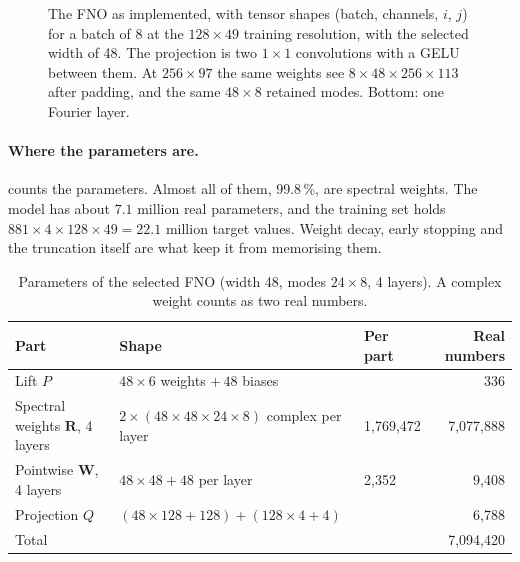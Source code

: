 \begin{figure}[t]
\caption{The FNO as implemented, with tensor shapes (batch, channels, $i$, $j$) for a batch of 8 at
the $128\times49$ training resolution, with the selected width of 48. The projection is two
$1\times1$ convolutions with a GELU between them. At $256\times97$ the same
weights see $8\times48\times256\times113$ after padding, and the same $48\times8$ retained modes.
Bottom: one Fourier layer.}
\label{fig:fnoarch}
\end{figure}

\paragraph{Where the parameters are.}
 counts the parameters. Almost all of them, 99.8\,\%, are spectral weights.
The model has about $7.1$ million real parameters, and the training set holds
$881\times4\times128\times49 = 22.1$ million target values. Weight decay, early stopping and
the truncation itself are what keep it from memorising them.

\begin{table}[t]
\centering\small
\caption{Parameters of the selected FNO (width 48, modes $24\times8$, 4 layers). A complex weight
counts as two real numbers.}
\label{tab:fnoparams}
\begin{tabular}{@{}lll r@{}}
\toprule
Part & Shape & Per part & Real numbers\\
\midrule
Lift $P$ & $48\times6$ weights $+\,48$ biases & & 336\\
Spectral weights $\bm R$, 4 layers & $2\times(48\times48\times24\times8)$ complex per layer & 1,769,472 & 7,077,888\\
Pointwise $\bm W$, 4 layers & $48\times48 + 48$ per layer & 2,352 & 9,408\\
Projection $Q$ & $(48\times128+128) + (128\times4+4)$ & & 6,788\\
\midrule
Total & & & 7,094,420\\
\bottomrule
\end{tabular}
\end{table}

